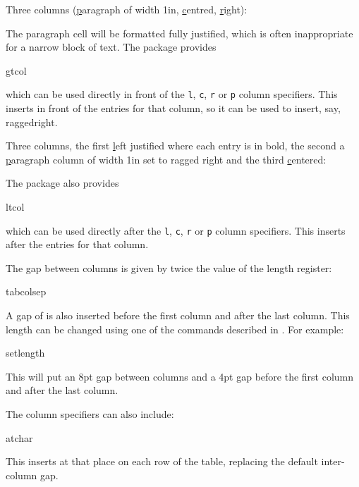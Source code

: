 Three columns (\underline{p}aragraph of width 1in,
\underline{c}entred, \underline{r}ight):
\begin{codeS}
\end{codeS}
The paragraph cell will be formatted fully justified, which is often
inappropriate for a narrow block of text. The  package
provides
\begin{definition}
\gls{gtcol}
\end{definition}
which can be used directly in front of the \texttt{l}, \texttt{c},
\texttt{r} or \texttt{p} column specifiers. This inserts
 in front of the entries for that column, so it
can be used to insert, say, \gls{raggedright}.

Three columns, the first \underline{l}eft justified where each entry
is in bold, the second a \underline{p}aragraph column of width 1in set to
ragged right and the third \underline{c}entered:
\begin{codeS}
\end{codeS}

The  package also provides
\begin{definition}
\gls{ltcol}
\end{definition}
which can be used directly after the \texttt{l}, \texttt{c},
\texttt{r} or \texttt{p} column specifiers. This inserts
 after the entries for that column.


The gap between columns is given by twice the value of the
\gls{length} register:
\begin{definition}
\gls{tabcolsep}
\end{definition}
A gap of  is
also inserted before the first column and after the last column.
This length can be changed using one of the commands described in
. For example:
\begin{codeS}
\gls{setlength}\marg{4pt}
\end{codeS}
This will put an 8pt gap between columns and a 4pt gap before the
first column and after the last column.

The column specifiers can also include:
\begin{definition}
\gls{atchar}
\end{definition}
This inserts  at that place on each row of
the table, replacing the default inter-column gap.

